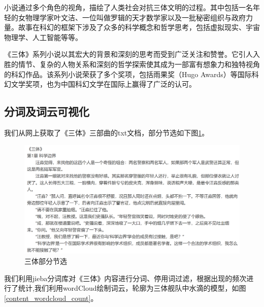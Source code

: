 \documentclass[12pt]{xjtureport}
\begin{document}
小说通过多个角色的视角，描绘了人类社会对抗三体文明的过程。其中包括一名年轻的女物理学家叶文洁、一位叫做罗辑的天才数学家以及一批秘密组织与政府力量。故事在科幻的框架下涉及了众多的科学概念和哲学思考，包括虚拟现实、宇宙物理学、人工智能等等。

《三体》系列小说以其宏大的背景和深刻的思考而受到广泛关注和赞誉。它引人入胜的情节、复杂的人物关系和深刻的哲学探索使其成为一部富有想象力和独特视角的科幻作品。该系列小说荣获了多个奖项，包括雨果奖（Hugo Awards）等国际科幻文学奖项，也为中国科幻文学在国际上赢得了广泛的认可。


\subsection{分词及词云可视化}

\pagestyle{fancy}
\fancyhf{} %
\renewcommand{\headrulewidth}{0pt} %
\rhead{\thepage}

我们从网上获取了《三体》三部曲的txt文档，部分节选如下图\ref{content_threebody}。

\begin{figure}[!htbp]
    \centering
    \includegraphics[width=\linewidth]{figures/三体部分节选.png}
    \caption{三体部分节选}
    \label{content_threebody}
\end{figure}

我们利用jieba分词库对《三体》内容进行分词、停用词过滤，根据出现的频次进行了统计,我们利用wordCloud绘制词云，轮廓为三体舰队中水滴的模型，如图\ref{content_wordcloud_count}。
\end{document}
